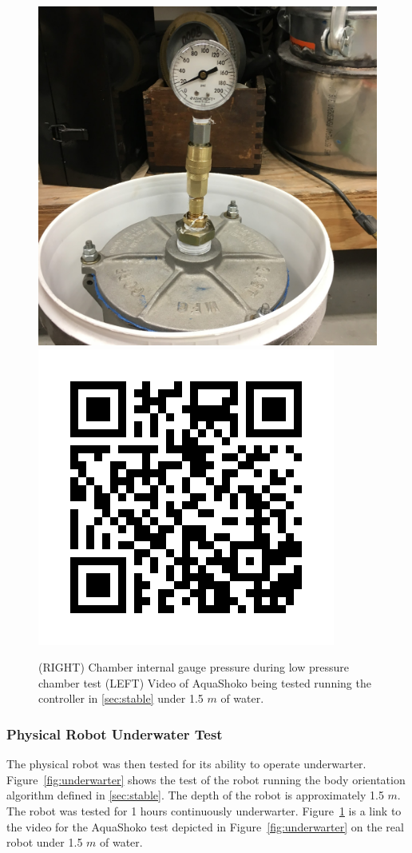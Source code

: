 \begin{figure}[h]
\centering
\includegraphics[width=0.5\columnwidth]{./img/aquaPod-test-two-pressureCheck.JPG}\includegraphics[width=0.5\columnwidth]{./img/qr.jpg}
\caption{(RIGHT) Chamber internal gauge pressure during low pressure chamber test (LEFT) Video of AquaShoko being tested running the controller in \ref{sec:stable} under 1.5 $m$ of water.}
\label{fig:test two pressure check-1}\label{fig:video}
\end{figure}

\subsubsection{Physical Robot Underwater Test}
The physical robot was then tested for its ability to operate underwarter.  
Figure~\ref{fig:underwarter} shows the test of the robot running the body orientation algorithm defined in \ref{sec:stable}.
The depth of the robot is approximately 1.5 $m$.
The robot was tested for 1 hours continuously underwarter.
Figure~\ref{fig:video} is a link to the video for the AquaShoko test depicted in Figure~\ref{fig:underwarter} on the real robot under 1.5 $m$ of water.







